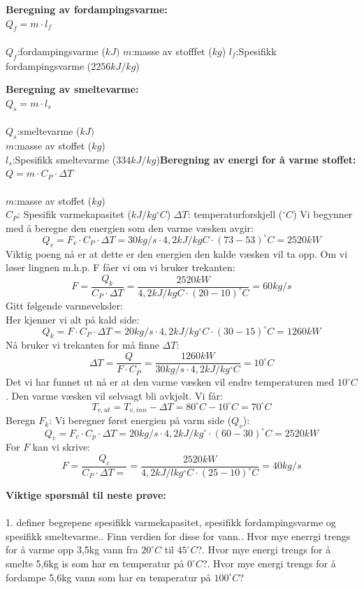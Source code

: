 \documentclass{minmal}
\begin{document}
\noindent\textbf{Beregning av fordampingsvarme:}\\
$Q_f=m\cdot l_f$\\\\
$Q_f$:fordampingsvarme ($kJ)$
$m$:masse av stofffet ($kg$)
$l_f$:Spesifikk fordampingsvarme ($2256kJ/kg$)\nl[2]

\noindent\textbf{Beregning av smeltevarme:}\\
$Q_s=m\cdot l_s$\\\\
$Q_s$:smeltevarme ($kJ)$\\
$m$:masse av stoffet ($kg$)\\
$l_s$:Spesifikk smeltevarme ($334kJ/kg$)\nl[2]
\noindent\textbf{Beregning av energi for å varme stoffet:}\\
$Q=m\cdot C_{P}\cdot \Delta T$\\\\
$m$:masse av stoffet ($kg$)\\
$C_P$: Spesifik varmekapasitet ($kJ/kg^\circ C$)
$\Delta T$: temperaturforskjell ($^\circ C$)
\newpage
{}
Vi begynner med å beregne den energien som den varme væsken avgir:\\
$$Q_v=F_v\cdot C_P\cdot \Delta T=30kg/s\cdot 4,2kJ/kgC\cdot (73-53)^\circ C=2520kW$$
Viktig poeng nå er at dette er den energien den kalde væsken vil ta opp.   Om vi løser lingnen m.h.p. F fåer vi om vi bruker trekanten:\\
$$F=\frac{Q_k}{C_P\cdot \Delta T}=\frac{2520kW}{4,2kJ/kgC\cdot (20-10)^\circ C}=60kg/s$$
\newpage
Gitt følgende varmeveksler:\\
Her kjenner vi alt på kald side:\\
$$Q_k=F\cdot C_P\cdot \Delta T=20kg/s\cdot 4,2kJ/kg^\circ C\cdot (30-15)^\circ C=1260kW $$
Nå bruker vi trekanten for må finne  $\Delta T$:
$$\Delta T=\frac{Q}{F\cdot C_P}=\frac{1260kW}{30kg/s\cdot 4,2kJ/kg^\circ C}=10^\circ C$$
Det vi har funnet ut nå er at den varme væsken vil endre temperaturen med $10^\circ C$.  Den varme væsken vil selvsagt bli avkjølt.  Vi får:
$$T_{v,ut}=T_{v, inn}-\Delta T=80^\circ C-10^\circ C=70^\circ C$$
\newpage
Beregn $F_k$:
Vi beregner først energien på varm side ($Q_v$):
$$Q_v=F_v\cdot C_p\cdot \Delta T=20kg/s\cdot 4,2kJ/kg^\circ \cdot(60-30)^\circ C=2520kW$$
For $F$ kan vi skrive:
$$F=\frac{Q_c}{C_P\cdot \Delta T=}=\frac{2520kW}{4,2kJ/lkg^\circ C\cdot(25-10)^\circ C}=40kg/s$$


\newpage
\noindent \textbf{Viktige spørsmål til neste prøve:}\\\\
1.  definer begrepene spesifikk varmekapasitet, spesifikk fordampingsvarme og spesifikk smeltevarme..  Finn verdien for disse for vann.. Hvor mye enerrgi trengs for å varme opp 3,5kg vann fra $20^\circ  C$ til $45^\circ C$?. Hvor mye energi trengs for å smelte 5,6kg is som har  en temperatur på $0^\circ  C$?. Hvor mye energi trengs for å fordampe 5,6kg vann som har  en temperatur på $100^\circ  C$?\nl[2]\newpage
\end{document}
